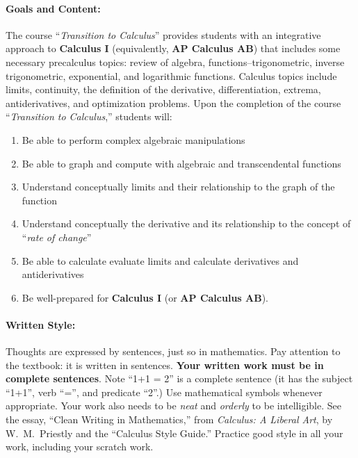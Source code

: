 \documentclass[11pt]{exam}
\begin{document}
\paragraph{Goals and Content:}
The course ``{\em Transition to Calculus\/}'' provides students with an integrative approach to {\bf Calculus I} (equivalently, {\bf AP Calculus AB}) that includes some necessary precalculus topics: review of algebra, functions--trigonometric, inverse trigonometric, exponential, and logarithmic functions. Calculus topics include limits, continuity, the definition of the derivative, differentiation, extrema, antiderivatives, and optimization problems. Upon the completion of the course ``{\em Transition to Calculus\/},'' students will: 
\begin{enumerate}
    \item Be able to perform complex algebraic manipulations
    \item Be able to graph and compute with algebraic and transcendental functions
    \item Understand conceptually limits and their relationship to the graph of the function
    \item Understand conceptually the derivative and its relationship to the concept of ``{\em rate of change\/}''
    \item Be able to calculate evaluate limits and calculate derivatives and antiderivatives
    \item Be well-prepared for {\bf Calculus I} (or {\bf AP Calculus AB}).
\end{enumerate}

\paragraph{Written Style:}
Thoughts are expressed by sentences, just so in mathematics.  
Pay attention to the textbook: it is written in sentences.
{\bfseries Your written work must be in complete sentences}.
Note ``1+1 = 2'' is a complete sentence (it has the subject ``1+1'', verb ``='', and predicate ``2''.)  
Use mathematical symbols whenever appropriate.
Your work also needs to be {\em neat\/} and {\em orderly\/} to be intelligible.
See the essay, ``Clean Writing in Mathematics,'' from {\em Calculus: A Liberal Art\/}, by W.~M.~Priestly and the ``Calculus Style Guide.''
Practice good style in all your work, including your scratch work. \\[2em]
\end{document}
